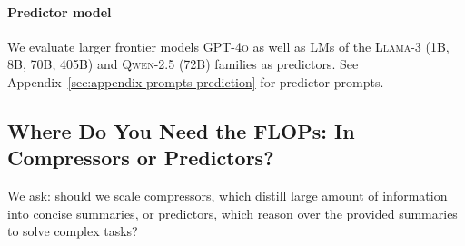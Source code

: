 \documentclass{article} %
\begin{document}
\paragraph*{Predictor model} 
We evaluate larger frontier models \textsc{GPT-4o} \citep{openai2024gpt4ocard} as well as LMs of the \textsc{Llama-3} (1B, 8B, 70B, 405B) and \textsc{Qwen-2.5} (72B) families as predictors. See Appendix~\ref{sec:appendix-prompts-prediction} for predictor prompts. %


\subsection{Where Do You Need the FLOPs: In Compressors or Predictors?}
\label{sec:compressor-predictor-intelligence}

We ask: should we scale compressors, which distill large amount of information into concise summaries, or predictors, which reason over the provided summaries to solve complex tasks?
\end{document}
